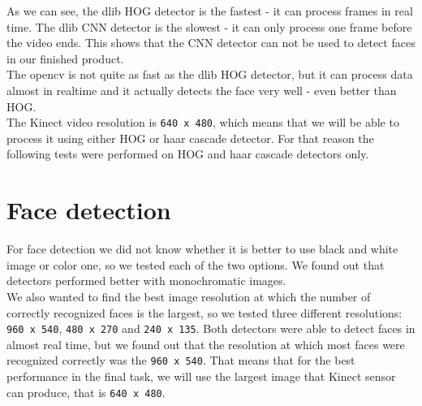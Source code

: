 \documentclass[12pt,a4paper]{report}
\begin{document}
	As we can see, the dlib HOG detector is the fastest - it can process frames in real time. The dlib CNN detector is the slowest - it can only process one frame before the video ends. This shows that the CNN detector can not be used to detect faces in our finished product. \\
	
	The opencv is not quite as fast as the dlib HOG detector, but it can process data almost in realtime and it actually detects the face very well - even better than HOG. \\
	
	The Kinect video resolution is \texttt{640 x 480}, which means that we will be able to process it using either HOG or haar cascade detector. For that reason the following tests were performed on HOG and haar cascade detectors only. \\
	
	\section{Face detection}
	
	For face detection we did not know whether it is better to use black and white image or color one, so we tested each of the two options. We found out that detectors performed better with monochromatic images. \\
	
	We also wanted to find the best image resolution at which the number of correctly recognized faces is the largest, so we tested three different resolutions: \texttt{960 x 540}, \texttt{480 x 270} and \texttt{240 x 135}. Both detectors were able to detect faces in almost real time, but we found out that the resolution at which most faces were recognized correctly was the \texttt{960 x 540}. That means that for the best performance in the final task, we will use the largest image that Kinect sensor can produce, that is \texttt{640 x 480}.
	
\end{document}
